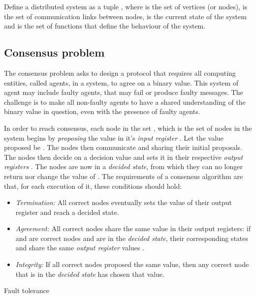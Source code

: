 Define a distributed system as a tuple , where  is the set of vertices (or nodes),  is the set of communication links between nodes,  is the current state of the system and  is the set of functions that define the behaviour of the system.

\subsection{Consensus problem}

The consensus problem asks to design a protocol that requires all computing entities, called agents, in a system, to agree on a binary value. This system of agent may include faulty agents, that may fail or produce faulty messages. The challenge is to make all non-faulty agents to have a shared understanding of the binary value in question, even with the presence of faulty agents. 

In order to reach consensus, each node in the set , which is the set of nodes in the system begins by \emph{proposing} the value in it's \emph{input register} . Let the value proposed be . The nodes then communicate and sharing their initial proposals. The nodes then decide on a decision value and sets it in their respective \emph{output registers} . The nodes are now in a \emph{decided state}, from which they can no longer return nor change the value of . The requirements of a consensus algorithm are that, for each execution of it, these conditions should hold:

\begin{itemize}[label={}]
  \item \emph{Termination:} All correct nodes eventually sets the value of their output register and reach a decided state.
  \item \emph{Agreement:} All correct nodes share the same value in their output registers: if  and  are correct nodes and are in the \emph{decided state}, their corresponding states  and  share the same \emph{output register} values .
  \item \emph{Integrity:} If all correct nodes proposed the same value, then any correct node that is in the \emph{decided state} has chosen that value.
\end{itemize}

Fault tolerance

